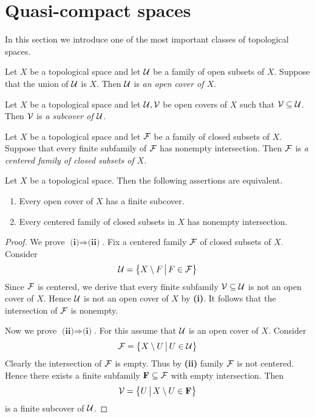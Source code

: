 \section{Quasi-compact spaces}
\noindent
In this section we introduce one of the most important classes of topological spaces.

\begin{definition}
	Let $X$ be a topological space and let ${\mathcal U}$ be a family of open subsets of $X$. Suppose that the union of ${\mathcal U}$ is $X$. Then ${\mathcal U}$ is \textit{an open cover of $X$}.
\end{definition}

\begin{definition}
	Let $X$ be a topological space and let ${\mathcal U}, {\mathcal V}$ be open covers of $X$ such that ${\mathcal V} \subseteq {\mathcal U}$. Then ${\mathcal V}$ is \textit{a subcover of ${\mathcal U}$}.
\end{definition}

\begin{definition}
	Let $X$ be a topological space and let ${\mathcal F}$ be a family of closed subsets of $X$. Suppose that every finite subfamily of ${\mathcal F}$ has nonempty intersection. Then ${\mathcal F}$ is \textit{a centered family of closed subsets of $X$}.
\end{definition}

\begin{proposition}\label{proposition:quasi-compactness_in_terms_of_open_covers_and_closed_intersections}
	Let $X$ be a topological space. Then the following assertions are equivalent.
	\begin{enumerate}[label=\emph{\textbf{(\roman*)}}, leftmargin=3.0em]
		\item Every open cover of $X$ has a finite subcover.
		\item Every centered family of closed subsets in $X$ has nonempty intersection.
	\end{enumerate}
\end{proposition}
\begin{proof}
	We prove $\textbf{(i)}\Rightarrow \textbf{(ii)}$. Fix a centered family ${\mathcal F}$ of closed subsets of $X$. Consider
	$${\mathcal U} = \big\{X\setminus F\,\big|\,F\in {\mathcal F}\big\}$$
	Since ${\mathcal F}$ is centered, we derive that every finite subfamily ${\mathcal V} \subseteq {\mathcal U}$ is not an open cover of $X$. Hence ${\mathcal U}$ is not an open cover of $X$ by \textbf{(i)}. It follows that the intersection of ${\mathcal F}$ is nonempty.

	Now we prove $\textbf{(ii)}\Rightarrow \textbf{(i)}$. For this assume that ${\mathcal U}$ is an open cover of $X$. Consider
	$${\mathcal F} = \big\{X\setminus U\,\big|\,U \in {\mathcal U}\big\}$$
	Clearly the intersection of ${\mathcal F}$ is empty. Thus by \textbf{(ii)} family ${\mathcal F}$ is not centered. Hence there exists a finite subfamily $\mathbf{F} \subseteq {\mathcal F}$ with empty intersection. Then
	$${\mathcal V} = \big\{U\,\big|\,X\setminus U \in \mathbf{F}\big\}$$
	is a finite subcover of ${\mathcal U}$.
\end{proof}

